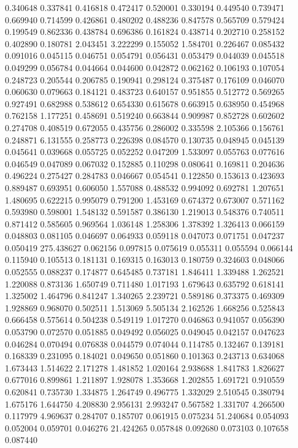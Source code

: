 0.340648
0.337841
0.416818
0.472417
0.520001
0.330194
0.449540
0.739471
0.669940
0.714599
0.426861
0.480202
0.488236
0.847578
0.565709
0.579424
0.199549
0.862336
0.438784
0.696386
0.161824
0.438714
0.202710
0.258152
0.402890
0.180781
2.043451
3.222299
0.155052
1.584701
0.226467
0.085432
0.091016
0.045115
0.046751
0.054791
0.056431
0.053479
0.044039
0.045518
0.049299
0.056784
0.044664
0.044600
0.042872
0.062162
0.106193
0.107054
0.248723
0.205544
0.206785
0.190941
0.298124
0.375487
0.176109
0.046070
0.060630
0.079663
0.184121
0.483723
0.640157
0.951855
0.512772
0.569265
0.927491
0.682988
0.538612
0.654330
0.615678
0.663915
0.638950
0.454968
0.762158
1.177251
0.458691
0.519240
0.663844
0.909987
0.852728
0.602602
0.274708
0.408519
0.672055
0.435756
0.286002
0.335598
2.105366
0.156761
0.248871
6.131555
0.258773
0.226398
0.084570
0.130735
0.048945
0.045139
0.045641
0.039668
0.055725
0.052252
0.047209
1.533097
0.055763
0.077616
0.046549
0.047089
0.067032
0.152885
0.110298
0.080641
0.169811
0.204636
0.496224
0.275427
0.284783
0.046667
0.054541
0.122850
0.153613
0.423693
0.889487
0.693951
0.606050
1.557088
0.488532
0.994092
0.692781
1.207651
1.480695
0.622215
0.995079
0.791200
1.453169
0.674372
0.673007
0.571162
0.593980
0.598001
1.548132
0.591587
0.386130
1.219013
0.548376
0.740511
0.871412
0.585605
0.969564
1.036148
1.258306
1.378392
1.326413
0.066159
0.048803
0.081105
0.046697
0.064933
0.059118
0.047073
0.071751
0.047237
0.050419
275.438627
0.062156
0.097815
0.075619
0.055311
0.055594
0.066144
0.115940
0.105513
0.181131
0.169315
0.163013
0.180759
0.324603
0.048066
0.052555
0.088237
0.174877
0.645485
0.737181
1.846411
1.339488
1.262521
1.220088
0.873136
1.650749
0.711480
1.017193
1.679643
0.635792
0.618141
1.325002
1.464796
0.841247
1.340265
2.239721
0.589186
0.373375
0.469309
1.928869
0.968070
0.502511
1.513069
5.505134
2.162526
1.668256
0.525843
0.666458
0.575614
0.504238
0.549119
1.017270
0.046863
0.941057
0.056390
0.053790
0.072570
0.051885
0.049492
0.056025
0.049045
0.042157
0.047623
0.046284
0.070494
0.076838
0.044579
0.074044
0.114785
0.132467
0.139181
0.168339
0.231095
0.184021
0.049650
0.051860
0.101363
0.243713
0.634068
1.673443
1.514622
2.171278
1.481852
1.020164
2.938688
1.841783
1.826627
0.677016
0.899861
1.211897
1.928078
1.353668
1.202855
1.691721
0.910559
0.620841
0.735730
1.334875
1.264749
0.496775
1.332029
2.510545
0.380794
1.675176
1.644750
4.208830
2.956131
2.993247
0.567582
1.331707
4.266500
0.117979
4.969637
0.284707
0.185707
0.061915
0.075234
51.240684
0.054093
0.052004
0.059701
0.046276
21.424265
0.057848
0.092680
0.073103
0.107658
0.087440
